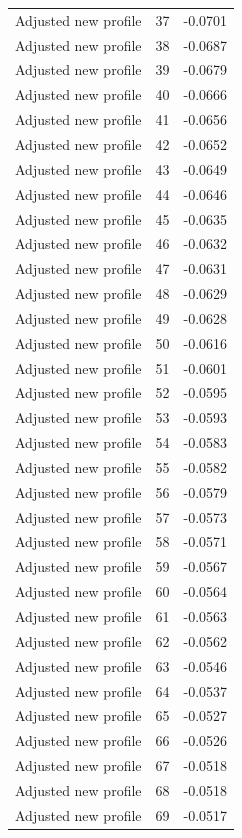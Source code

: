 \begin{table}[htbp]
\begin{tabular}{lll}
Adjusted new profile & 37 & -0.0701 \\
Adjusted new profile & 38 & -0.0687 \\
Adjusted new profile & 39 & -0.0679 \\
Adjusted new profile & 40 & -0.0666 \\
Adjusted new profile & 41 & -0.0656 \\
Adjusted new profile & 42 & -0.0652 \\
Adjusted new profile & 43 & -0.0649 \\
Adjusted new profile & 44 & -0.0646 \\
Adjusted new profile & 45 & -0.0635 \\
Adjusted new profile & 46 & -0.0632 \\
Adjusted new profile & 47 & -0.0631 \\
Adjusted new profile & 48 & -0.0629 \\
Adjusted new profile & 49 & -0.0628 \\
Adjusted new profile & 50 & -0.0616 \\
Adjusted new profile & 51 & -0.0601 \\
Adjusted new profile & 52 & -0.0595 \\
Adjusted new profile & 53 & -0.0593 \\
Adjusted new profile & 54 & -0.0583 \\
Adjusted new profile & 55 & -0.0582 \\
Adjusted new profile & 56 & -0.0579 \\
Adjusted new profile & 57 & -0.0573 \\
Adjusted new profile & 58 & -0.0571 \\
Adjusted new profile & 59 & -0.0567 \\
Adjusted new profile & 60 & -0.0564 \\
Adjusted new profile & 61 & -0.0563 \\
Adjusted new profile & 62 & -0.0562 \\
Adjusted new profile & 63 & -0.0546 \\
Adjusted new profile & 64 & -0.0537 \\
Adjusted new profile & 65 & -0.0527 \\
Adjusted new profile & 66 & -0.0526 \\
Adjusted new profile & 67 & -0.0518 \\
Adjusted new profile & 68 & -0.0518 \\
Adjusted new profile & 69 & -0.0517 \\

\end{tabular}
\end{table}
